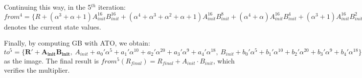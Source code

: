 \begin{Example}
Continuing this way, in the 5$^{th}$ iteration: $from^4 =
\{R+(\alpha^3+\alpha+1) A_{init}^{16} 
B_{init}^{16}+(\alpha^4+\alpha^3+\alpha^2+\alpha+1) A_{init}^{16}
B_{init}^8+(\alpha^4+\alpha) A_{init}^{16} B_{init}^4+(\alpha^3+1)
A_{init}^{16} B_{init}^2+(\alpha^3+\alpha+1) A_{init}^{16}
B_{init}+(\alpha^4+\alpha^3+\alpha^2+\alpha+1) A_{init}^8
B_{init}^{16}+(\alpha^3+1) A_{init}^8
B_{init}^8+(\alpha^4+\alpha^2+\alpha) A_{init}^8
B_{init}^4+(\alpha^2+\alpha) A_{init}^8
B_{init}^2+(\alpha^3+\alpha^2+1) A_{init}^8 B_{init}+(\alpha^4+\alpha)
A_{init}^4 B_{init}^{16}+(\alpha^4+\alpha^2+\alpha) A_{init}^4
B_{init}^8+(\alpha^4+\alpha^2+\alpha) A_{init}^4
B_{init}^4+(\alpha^2+\alpha) A_{init}^4 B_{init}+(\alpha^3+1)
A_{init}^2 B_{init}^{16}+(\alpha^2+\alpha) A_{init}^2
B_{init}^8+(\alpha^4+\alpha^2) A_{init}^2
B_{init}^2+(\alpha^3+\alpha^2+1) A_{init}^2
B_{init}+(\alpha^3+\alpha+1) A_{init}
B_{init}^{16}+(\alpha^3+\alpha^2+1) A_{init}
B_{init}^8+(\alpha^2+\alpha) A_{init} B_{init}^4+(\alpha^3+\alpha^2+1)
A_{init} B_{init}^2+(\alpha) A_{init} B_{init}, 
~~A_{init}+a_1\alpha^5+a_2\alpha^{10}+a_3\alpha^{20}+a_4\alpha^9+a_0\alpha^{18},
~~B_{init}+b_1\alpha^5+b_2\alpha^{10}+b_3\alpha^{20}+b_4\alpha^9+b_0\alpha^{18}\}$
denotes the current state values. 

Finally, by computing GB with ATO, we obtain: $to^5 = \{ \mathbf{R'+A_{init}B_{init},}
~A_{init}+a_0'\alpha^5+a_1'\alpha^{10}+a_2'\alpha^{20}+a_3'\alpha^9+a_4'\alpha^{18},
~B_{init}+b_0'\alpha^5+b_1'\alpha^{10}+b_2'\alpha^{20}+b_3'\alpha^9+b_4'\alpha^{18}\}$
as the image. The final result is $from^5(R_{final}) = R_{final}+A_{init}\cdot
B_{init}$, which verifies the multiplier. 
\end{Example}
